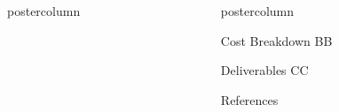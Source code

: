 \documentclass{beamer}
\newlength{\columnheight}
\begin{document}
\begin{frame}
\begin{columns}
\begin{column}{.5\textwidth}
\begin{beamercolorbox}[center]{postercolumn}
\begin{minipage}{.98\textwidth}
{		}\end{minipage}\end{beamercolorbox}
	\end{column}
	\begin{column}{.5\textwidth}
		\begin{beamercolorbox}[center]{postercolumn}
			\begin{minipage}{.98\textwidth} %
				\parbox[t][\columnheight]{\textwidth}{ %
					\begin{myblock}{Cost Breakdown}
				BB
					\end{myblock} \vfill
					\begin{myblock}{Deliverables}
				CC
					\end{myblock} \vfill
					\begin{myblock}{References}
						\footnotesize
						
						
					\end{myblock}
		}\end{minipage}\end{beamercolorbox}
	\end{column}
\end{columns}
\end{frame}
\end{document}
